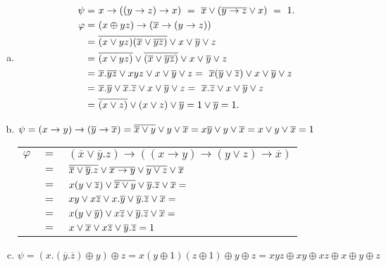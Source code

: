 \begin{solution}
  \begin{enumerate}[a)]
  \item
    \begin{align*}
      \psi  =\ & x\rightarrow ((y\rightarrow z)\rightarrow x)\ =\ \overline{x}\vee (\overline{y\rightarrow z}\vee x)\  =\ 1.\\
      \varphi =\ & (x\oplus yz)\rightarrow (\overline{x}\rightarrow (y\rightarrow z))\\
      =\ & \overline{(x\vee yz)(\overline{x}\vee\overline{yz})} \vee x\vee \overline{y}\vee z\\
      =\ & \overline{(x\vee yz)}\vee\overline{(\overline{x}\vee\overline{yz})} \vee x\vee \overline{y}\vee z\\
      =\ & \overline{x}.\overline{yz} \vee xyz \vee x\vee \overline{y}\vee z =\ \overline{x}(\overline{y}\vee\overline{z}) \vee x\vee \overline{y}\vee z\\
      =\ & \overline{x}.\overline{y} \vee \overline{x}.\overline{z} \vee x\vee \overline{y}\vee z =\ \overline{x}.\overline{z} \vee x\vee \overline{y}\vee z\\
      =\ & \overline{(x\vee z)} \vee (x\vee z)\vee \overline{y} = 1 \vee \ov{y} = 1.
    \end{align*}
  \item
    $\psi = (x\rightarrow y)\rightarrow(\overline{y}\rightarrow\overline{x}) = 
    \overline{\overline{x}\vee y} \vee y \vee \overline{x} = x\overline{y} \vee y \vee \overline{x} = x \vee y \vee \overline{x} = 1$
    
    \begin{tabular}{l c l}
      $\varphi $ & $=$ & $(\overline{x}\vee \overline{y}.z)\rightarrow ((x\rightarrow y)\rightarrow (y\vee z)\rightarrow\overline{x}) $\\
      & $ = $ & $\overline{\overline{x}\vee \overline{y}.z} \vee \overline{x\rightarrow y} \vee \overline{y\vee z} \vee \overline{x}$ \\
      & $=$ & $x(y\vee \overline{z})\vee \overline{\overline{x}\vee y} \vee \overline{y}.\overline{z} \vee \overline{x} = $\\
      & $=$ & $xy \vee x\overline{z} \vee x.\overline{y} \vee \overline{y}.\overline{z} \vee \overline{x} =$ \\
      & $=$ & $x(y\vee\overline{y}) \vee x\overline{z} \vee \overline{y}.\overline{z} \vee \overline{x} = $\\
      & $=$ & $x \vee \overline{x} \vee x\overline{z} \vee \overline{y}.\overline{z} = 1$
    \end{tabular}
    
  \item
    $\psi = (x.(\overline{y}.\overline{z})\oplus y)\oplus z = x(y\oplus 1)(z\oplus 1) \oplus y \oplus z = xyz \oplus xy \oplus xz \oplus x \oplus y \oplus z$
    

\end{enumerate}
\end{solution}
